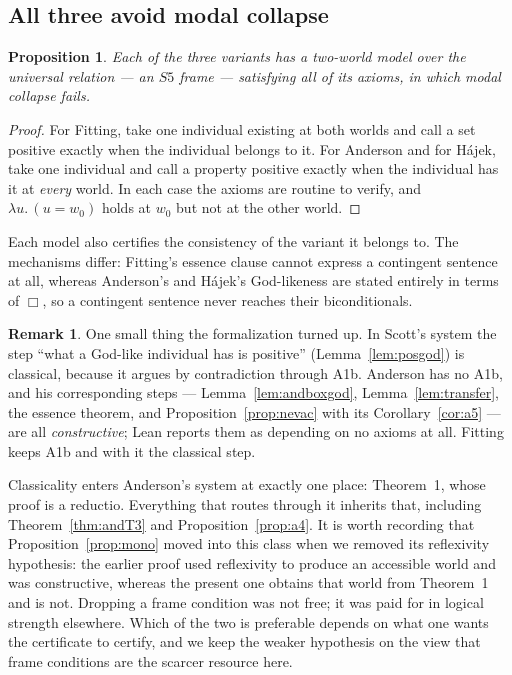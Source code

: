 \documentclass[11pt]{article}
\theoremstyle{plain}
\newtheorem{proposition}[theorem]{Proposition}
\theoremstyle{definition}
\newtheorem{remark}[theorem]{Remark}
\begin{document}
\subsection{All three avoid modal collapse}

\begin{proposition}\label{prop:variantsnocollapse}
Each of the three variants has a two-world model over the universal relation
--- an $S5$ frame --- satisfying all of its axioms, in which modal collapse
fails.
\end{proposition}

\begin{proof}
For Fitting, take one individual existing at both worlds and call a set
positive exactly when the individual belongs to it. For Anderson and for
H\'ajek, take one individual and call a property positive exactly when the
individual has it at \emph{every} world. In each case the axioms are routine to
verify, and $\lambda u.\,(u = w_0)$ holds at $w_0$ but not at the other world.
\end{proof}

\noindent
Each model also certifies the consistency of the variant it belongs to. The
mechanisms differ: Fitting's essence clause cannot express a contingent
sentence at all, whereas Anderson's and H\'ajek's God-likeness are stated
entirely in terms of $\Box$, so a contingent sentence never reaches their
biconditionals.

\begin{remark}
One small thing the formalization turned up. In Scott's system the step ``what
a God-like individual has is positive'' (Lemma~\ref{lem:posgod}) is classical,
because it argues by contradiction through A1b. Anderson has no A1b, and his
corresponding steps --- Lemma~\ref{lem:andboxgod}, Lemma~\ref{lem:transfer}, the
essence theorem, and Proposition~\ref{prop:nevac} with its
Corollary~\ref{cor:a5} --- are all \emph{constructive}; Lean reports them as
depending on no axioms at all. Fitting keeps A1b and with it the classical
step.

Classicality enters Anderson's system at exactly one place: Theorem~1, whose
proof is a reductio. Everything that routes through it inherits that, including
Theorem~\ref{thm:andT3} and Proposition~\ref{prop:a4}. It is worth recording
that Proposition~\ref{prop:mono} moved into this class when we removed its
reflexivity hypothesis: the earlier proof used reflexivity to produce an
accessible world and was constructive, whereas the present one obtains that
world from Theorem~1 and is not. Dropping a frame condition was not free; it
was paid for in logical strength elsewhere. Which of the two is preferable
depends on what one wants the certificate to certify, and we keep the weaker
hypothesis on the view that frame conditions are the scarcer resource here.
\end{remark}
\end{document}
